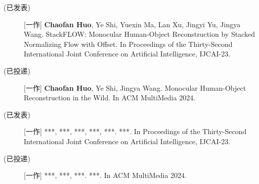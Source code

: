 \documentclass[master]{shtthesis}
\begin{document}
\begin{publications}
  \begin{description}
    \item[(已发表)] [一作] \textbf{Chaofan Huo}, Ye Shi, Yuexin Ma, Lan Xu, Jingyi Yu, Jingya Wang. StackFLOW: Monocular Human-Object Reconstruction by Stacked Normalizing Flow with Offset. In Proceedings of the Thirty-Second International Joint Conference on Artificial Intelligence, {IJCAI-23}.
    \item[(已投递)] [一作] \textbf{Chaofan Huo}, Ye Shi, Jingya Wang. Monocular Human-Object Reconstruction in the Wild. In ACM MultiMedia 2024.
  \end{description}
\end{publications}

\begin{publications*}
  \begin{description}
    \item[(已发表)] [一作] ***, ***, ***, ***, ***. ***. In Proceedings of the Thirty-Second International Joint Conference on Artificial Intelligence, {IJCAI-23}.
    \item[(已投递)] [一作] ***, ***, ***. ***. In ACM MultiMedia 2024.
  \end{description}
\end{publications*}



\fi
\end{document}
